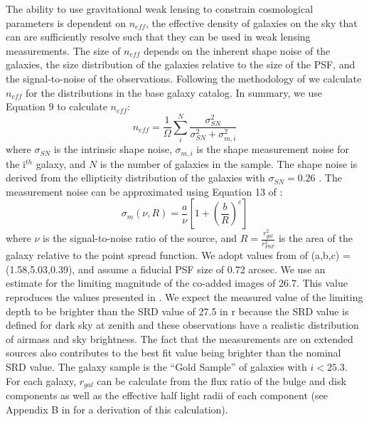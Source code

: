 \documentclass[]{article}
\begin{document}
The ability to use gravitational weak lensing to constrain
cosmological parameters is dependent on $n_{eff}$, the effective
density of galaxies on the sky that can are sufficiently resolve such
that they can be used in weak lensing
measurements. The size of $n_{eff}$ depends on the inherent shape
noise of the galaxies, the size distribution of the galaxies relative
to the size of the PSF, and the signal-to-noise of the observations.
Following the methodology of \citet{chang} we calculate $n_{eff}$ for
the distributions in the base galaxy catalog.  In summary, we use
Equation 9 to calculate $n_{eff}$:
\begin{equation}
n_{eff} = \frac{1}{\Omega}\sum^N_i\frac{\sigma^2_{SN}}{\sigma^2_{SN}+\sigma^2_{m,i}}
\end{equation}
where $\sigma_{SN}$ is the intrinsic shape noise, $\sigma_{m,i}$ is
the shape measurement noise for the i$^{th}$ galaxy, and $N$ is the
number of galaxies in the sample. The shape noise is derived from the
ellipticity distribution of the galaxies with $\sigma_{SN} = 0.26$
\citep{chang}.  The measurement noise can be approximated using
Equation 13 of \citet{chang}:
\begin{equation}
\sigma_m(\nu,R) = \frac{a}{\nu}\left[1+\left(\frac{b}{R}\right)^c\right]
\end{equation}
where $\nu$ is the signal-to-noise ratio of the source, and
$R=\frac{r_{gal}^2}{r_{PSF}^2}$ is the area of the galaxy relative to
the point spread function.  We adopt values from \citet{chang} of
(a,b,c) = (1.58,5.03,0.39), and assume a fiducial PSF size of 0.72
arcsec. We use an estimate for the limiting magnitude of the co-added
images of 26.7.  This value reproduces the values presented in
\citet{chang}.  We expect the measured value of the limiting depth
to be brighter than the SRD value of 27.5 in r because the SRD value
is defined for dark sky at zenith and these observations have a 
realistic distribution of airmass and sky brightness.  The fact
that the measurements are on extended sources also contributes to 
the best fit value being brighter than the nominal SRD value.
The galaxy sample is the ``Gold Sample'' of galaxies with $i < 25.3$.  For
each galaxy, $r_{gal}$ can be calculate from the flux ratio of the
bulge and disk components as well as the effective half light radii of
each component (see Appendix B in \citet{chang} for a derivation of
this calculation).
\end{document}
